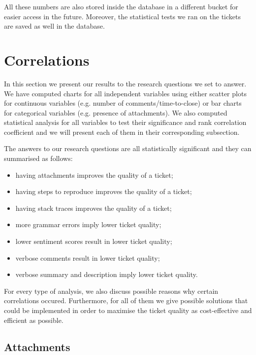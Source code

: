 \documentclass{mpaper}
\begin{document}
All these numbers are also stored inside the database in a different bucket for easier access in the future. Moreover, the statistical 
tests we ran on the tickets are saved as well in the database.

\section{Correlations}\label{correlations}

In this section we present our results to the research questions we set to answer. We have computed charts for all 
independent variables using either scatter plots for continuous variables (e.g. number of comments/time-to-close) 
or bar charts for categorical variables (e.g. presence of attachments). We also computed statistical analysis for 
all variables to test their significance and rank correlation coefficient and we will present each of them in their 
corresponding subsection. 

The answers to our research questions are all statistically significant and they can summarised as follows:
\begin{itemize}
  \item having attachments improves the quality of a ticket;
  \item having steps to reproduce improves the quality of a ticket;
  \item having stack traces improves the quality of a ticket;
  \item more grammar errors imply lower ticket quality;
  \item lower sentiment scores result in lower ticket quality;
  \item verbose comments result in lower ticket quality;
  \item verbose summary and description imply lower ticket quality.
\end{itemize}

For every type of analysis, we also discuss possible reasons why certain correlations occured. Furthermore, for all 
of them we give possible solutions that could be implemented in order to maximise the ticket quality as cost-effective 
and efficient as possible.

\subsection{Attachments}
\end{document}

